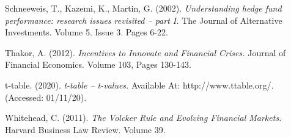 \documentclass[11pt, english]{article}
\begin{document}
\begin{thebibliography}{9}
		Schneeweis, T., Kazemi, K., Martin, G. (2002).                   
                \textsl{Understanding hedge fund performance: research issues revisited – part I.}
		The Journal of Alternative Investments. Volume 5. Issue 3. Pages 6-22.
			
                Thakor, A. (2012).
                \textsl{Incentives to Innovate and Financial Crises.}
		Journal of Financial Economics. Volume 103, Pages 130-143.

                t-table. (2020).
                \textsl{t-table – t-values.}
		Available At:
		http://www.ttable.org/.
		(Accessed: 01/11/20).

                Whitehead, C. (2011). 
                \textsl{The Volcker Rule and Evolving Financial Markets.}
		Harvard Business Law Review. Volume 39.

\end{thebibliography}
\end{document}
